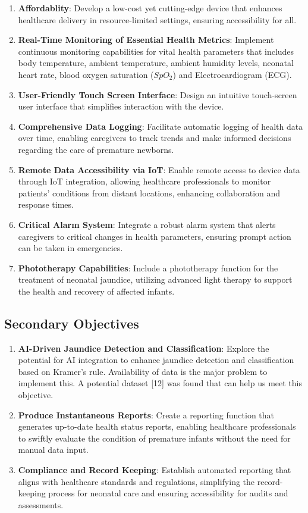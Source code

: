 \documentclass{article}
\begin{document}
\begin{enumerate}
\def\labelenumi{\arabic{enumi}.}
\item
  \textbf{Affordablity}: Develop a low-cost yet cutting-edge device that
  enhances healthcare delivery in resource-limited settings, ensuring
  accessibility for all.
\item
  \textbf{Real-Time Monitoring of Essential Health Metrics}: Implement
  continuous monitoring capabilities for vital health parameters that
  includes body temperature, ambient temperature, ambient humidity
  levels, neonatal heart rate, blood oxygen saturation (\(SpO_2\)) and
  Electrocardiogram (ECG).
\item
  \textbf{User-Friendly Touch Screen Interface}: Design an intuitive
  touch-screen user interface that simplifies interaction with the
  device.
\item
  \textbf{Comprehensive Data Logging}: Facilitate automatic logging of
  health data over time, enabling caregivers to track trends and make
  informed decisions regarding the care of premature newborns.
\item
  \textbf{Remote Data Accessibility via IoT}: Enable remote access to
  device data through IoT integration, allowing healthcare professionals
  to monitor patients' conditions from distant locations, enhancing
  collaboration and response times.
\item
  \textbf{Critical Alarm System}: Integrate a robust alarm system that
  alerts caregivers to critical changes in health parameters, ensuring
  prompt action can be taken in emergencies.
\item
  \textbf{Phototherapy Capabilities}: Include a phototherapy function
  for the treatment of neonatal jaundice, utilizing advanced light
  therapy to support the health and recovery of affected infants.
\end{enumerate}

\subsection{Secondary Objectives}\label{secondary-objectives}

\begin{enumerate}
\def\labelenumi{\arabic{enumi}.}
\item
  \textbf{AI-Driven Jaundice Detection and Classification}: Explore the
  potential for AI integration to enhance jaundice detection and
  classification based on Kramer's rule. Availability of data is the
  major problem to implement this. A potential dataset {[}12{]} was
  found that can help us meet this objective.
\item
  \textbf{Produce Instantaneous Reports}: Create a reporting function
  that generates up-to-date health status reports, enabling healthcare
  professionals to swiftly evaluate the condition of premature infants
  without the need for manual data input.
\item
  \textbf{Compliance and Record Keeping}: Establish automated reporting
  that aligns with healthcare standards and regulations, simplifying the
  record-keeping process for neonatal care and ensuring accessibility
  for audits and assessments.
\end{enumerate}
\end{document}
